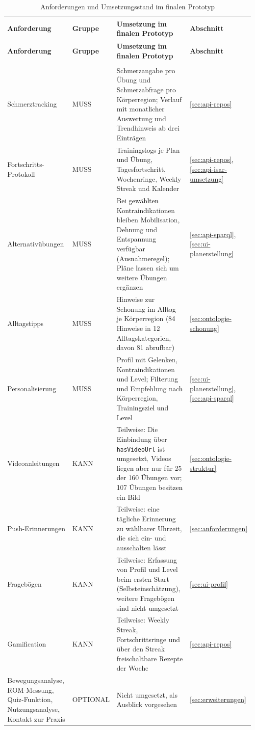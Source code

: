 {\renewcommand{\arraystretch}{1.3}
\begin{xltabular}{\textwidth}{@{} >{\raggedright\arraybackslash}p{3.1cm} >{\raggedright\arraybackslash}p{2.2cm} >{\raggedright\arraybackslash}X >{\raggedright\arraybackslash}p{2.1cm} @{}}
    \caption{Anforderungen und Umsetzungsstand im finalen Prototyp}
    \label{tab:soll_ist} \\
    \toprule
    \textbf{Anforderung} & \textbf{Gruppe} & \textbf{Umsetzung im finalen Prototyp} & \textbf{Abschnitt} \\
    \midrule
    \endfirsthead
    \toprule
    \textbf{Anforderung} & \textbf{Gruppe} & \textbf{Umsetzung im finalen Prototyp} & \textbf{Abschnitt} \\
    \midrule
    \endhead
    \midrule
     \\
    \endfoot
    \bottomrule
    \endlastfoot
    Schmerztracking & MUSS & Schmerzangabe pro Übung und Schmerzabfrage pro Körperregion; Verlauf mit monatlicher Auswertung und Trendhinweis ab drei Einträgen & \ref{sec:api-repos} \\
    Fortschritts-Protokoll & MUSS & Trainingslogs je Plan und Übung, Tagesfortschritt, Wochenringe, Weekly Streak und Kalender & \ref{sec:api-repos}, \ref{sec:api-isar-umsetzung} \\
    Alternativübungen & MUSS & Bei gewählten Kontraindikationen bleiben Mobilisation, Dehnung und Entspannung verfügbar (Ausnahmeregel); Pläne lassen sich um weitere Übungen ergänzen & \ref{sec:api-sparql}, \ref{sec:ui-planerstellung} \\
    Alltagstipps & MUSS & Hinweise zur Schonung im Alltag je Körperregion (84 Hinweise in 12 Alltagskategorien, davon 81 abrufbar) & \ref{sec:ontologie-schonung} \\
    Personalisierung & MUSS & Profil mit Gelenken, Kontraindikationen und Level; Filterung und Empfehlung nach Körperregion, Trainingsziel und Level & \ref{sec:ui-planerstellung}, \ref{sec:api-sparql} \\
    Videoanleitungen & KANN & Teilweise: Die Einbindung über \texttt{hasVideoUrl} ist umgesetzt, Videos liegen aber nur für 25 der 160 Übungen vor; 107 Übungen besitzen ein Bild & \ref{sec:ontologie-struktur} \\
    Push-Erinnerungen & KANN & Teilweise: eine tägliche Erinnerung zu wählbarer Uhrzeit, die sich ein- und ausschalten lässt & \ref{sec:anforderungen} \\
    Fragebögen & KANN & Teilweise: Erfassung von Profil und Level beim ersten Start (Selbsteinschätzung), weitere Fragebögen sind nicht umgesetzt & \ref{sec:ui-profil} \\
    Gamification & KANN & Teilweise: Weekly Streak, Fortschrittsringe und über den Streak freischaltbare Rezepte der Woche & \ref{sec:api-repos} \\
    Bewegungsanalyse, ROM-Messung, Quiz-Funktion, Nutzungsanalyse, Kontakt zur Praxis & OPTIONAL & Nicht umgesetzt, als Ausblick vorgesehen & \ref{sec:erweiterungen} \\
\end{xltabular}
}

